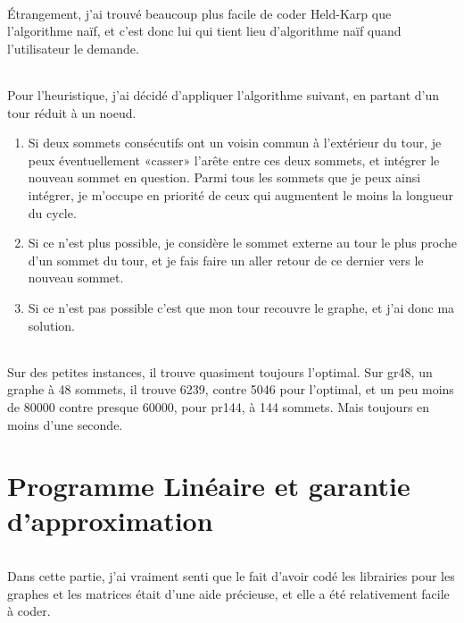 \documentclass[a4paper]{article}
\begin{document}
\paragraph{}
Étrangement, j'ai trouvé beaucoup plus facile de coder Held-Karp que l'algorithme naïf, et c'est donc lui qui tient lieu d'algorithme naïf quand l'utilisateur le demande.

\paragraph{}
Pour l'heuristique, j'ai décidé d'appliquer l'algorithme suivant, en partant d'un tour réduit à un noeud.
\begin{enumerate}
  \item Si deux sommets consécutifs ont un voisin commun à l'extérieur du tour, je peux éventuellement «casser» l'arête entre ces deux sommets, et intégrer le nouveau sommet en question. Parmi tous les sommets que je peux ainsi intégrer, je m'occupe en priorité de ceux qui augmentent le moins la longueur du cycle.
  \item Si ce n'est plus possible, je considère le sommet externe au tour le plus proche d'un sommet du tour, et je fais faire un aller retour de ce dernier vers le nouveau sommet.
  \item Si ce n'est pas possible c'est que mon tour recouvre le graphe, et j'ai donc ma solution.
\end{enumerate}

\paragraph{}
Sur des petites instances, il trouve quasiment toujours l'optimal. Sur gr48, un graphe à 48 sommets, il trouve 6239, contre 5046 pour l'optimal, et un peu moins de 80000 contre presque 60000, pour pr144, à 144 sommets. Mais toujours en moins d'une seconde.

\part{Programme Linéaire et garantie d'approximation}

\paragraph{}
Dans cette partie, j'ai vraiment senti que le fait d'avoir codé les librairies pour les graphes et les matrices était d'une aide précieuse, et elle a été relativement facile à coder.
\end{document}
